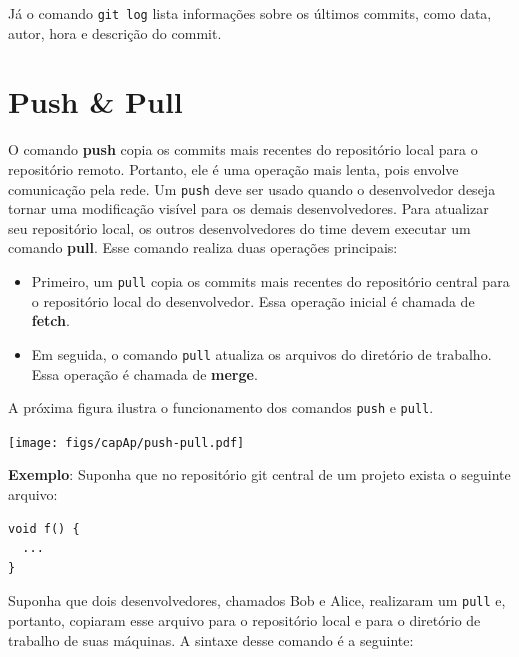 \documentclass[
  11pt,
  twoside]{book}
\newcommand{\passthrough}[1]{#1}
\let\origfigure\figure
\let\endorigfigure\endfigure
\renewenvironment{figure}[1][2] {
    \expandafter\origfigure\expandafter[!h]
} {
    \endorigfigure
}
\begin{document}
 Já o comando \passthrough{\lstinline!git log!} lista
informações sobre os últimos commits, como data, autor, hora e descrição
do commit.

\hypertarget{push-pull}{%
\section{Push \& Pull}\label{push-pull}}

  O comando \textbf{push} copia os
commits mais recentes do repositório local para o repositório remoto.
Portanto, ele é uma operação mais lenta, pois envolve comunicação pela
rede. Um \passthrough{\lstinline!push!} deve ser usado quando o
desenvolvedor deseja tornar uma modificação visível para os demais
desenvolvedores. Para atualizar seu repositório local, os outros
desenvolvedores do time devem executar um comando \textbf{pull}. Esse
comando realiza duas operações principais:

\begin{itemize}
\item
  Primeiro, um \passthrough{\lstinline!pull!} copia os commits mais
  recentes do repositório central para o repositório local do
  desenvolvedor. Essa operação inicial é chamada de \textbf{fetch}.
\item
  Em seguida, o comando \passthrough{\lstinline!pull!} atualiza os
  arquivos do diretório de trabalho. Essa operação é chamada de
  \textbf{merge}.
\end{itemize}

A próxima figura ilustra o funcionamento dos comandos
\passthrough{\lstinline!push!} e \passthrough{\lstinline!pull!}.

\begin{figure}
\centering
\texttt{[image: figs/capAp/push-pull.pdf]}
\caption{Comandos \passthrough{\lstinline!push!} e
\passthrough{\lstinline!pull!}}
\end{figure}

\textbf{Exemplo}: Suponha que no repositório git central de um projeto
exista o seguinte arquivo:

\begin{lstlisting}
void f() {
  ... 
}
\end{lstlisting}

Suponha que dois desenvolvedores, chamados Bob e Alice, realizaram um
\passthrough{\lstinline!pull!} e, portanto, copiaram esse arquivo para o
repositório local e para o diretório de trabalho de suas máquinas. A
sintaxe desse comando é a seguinte:
\end{document}
